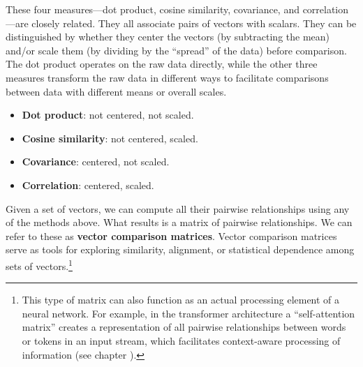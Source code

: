 
   These four measures—dot product, cosine similarity, covariance, and 
correlation—are closely related. They all associate pairs of vectors with 
scalars. They can be distinguished by whether they center the vectors (by 
subtracting the mean) and/or scale them (by dividing by the
``spread'' of the data) before comparison. The dot product operates on the raw
data directly, while the other three measures transform the raw data in
different ways to facilitate comparisons between data with different means or 
overall scales.

\begin{itemize}
    \item \textbf{Dot product}: not centered, not scaled.
    \item \textbf{Cosine similarity}: not centered, scaled.
    \item \textbf{Covariance}: centered, not scaled.
    \item \textbf{Correlation}: centered, scaled.
\end{itemize}

Given a set of vectors, we can compute all their pairwise relationships using any of the methods above. What results is a matrix of pairwise relationships. We can refer to these as \textbf{vector comparison matrices}. Vector comparison matrices serve as  tools for exploring similarity, alignment, or statistical dependence among sets of vectors.\footnote{This type of matrix can also function as an actual processing element of a neural network. For example,  in the transformer architecture a ``self-attention matrix'' creates a representation of all pairwise relationships between words or tokens in an input stream, which facilitates context-aware processing of information (see chapter ).}  


